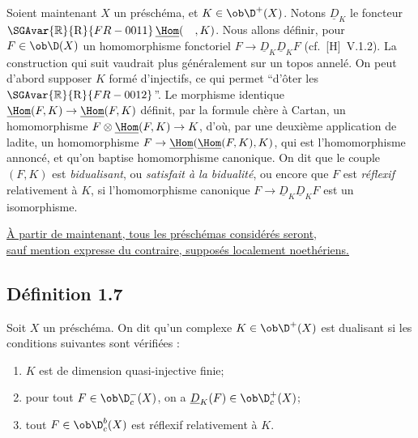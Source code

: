 Soient maintenant $X$ un préschéma, et $K \in \ob \D^{+}(X)$. Notons $\underline{D}_K$ le foncteur $\SGAvar{\mathbb{R}}{\mathrm{R}}{FR-0011}\,\underline{\Hom}(\quad, K)$. Nous allons définir, pour $F \in \ob \D(X)$ un homomorphisme fonctoriel $F \to \underline{D}_K \underline{D}_K F$ (cf.~[H]~V.1.2). La construction qui suit vaudrait plus généralement sur un topos annelé. On peut d'abord supposer $K$
formé d'injectifs, ce qui permet ``d'ôter les $\SGAvar{\mathbb{R}}{\mathrm{R}}{FR-0012}$''. Le morphisme identique $\underline{\Hom}(F,K) \to \underline{\Hom}(F,K)$ définit, par la formule chère à Cartan, un homomorphisme $F \otimes \underline{\Hom}(F,K) \to K$, d'où, par une deuxième application de ladite, un homomorphisme $F \to \underline{\Hom}(\underline{\Hom}(F,K), K)$, qui est l'homomorphisme annoncé, et qu'on baptise homomorphisme canonique. On dit que le couple $(F,K)$ est \emph{bidualisant}, ou \emph{satisfait à la bidualité}, ou encore que $F$ est \emph{réflexif} relativement à $K$, si l'homomorphisme canonique $F \to \underline{D}_K \underline{D}_K F$ est un isomorphisme.

\noindent\underline{À partir de maintenant, tous les préschémas considérés seront,}\\[-0.1em]\underline{sauf mention expresse du contraire, supposés localement noethériens.}

\subsection*{Définition 1.7}
Soit $X$ un préschéma. On dit qu'un complexe $K \in \ob \D^{+}(X)$ est dualisant si les conditions suivantes sont vérifiées :
\begin{enumerate}[label=(\roman*)]
\item $K$ est de dimension quasi-injective finie;
\item pour tout $F \in \ob \D_c^{-}(X)$, on a $\underline{D}_K(F) \in \ob \D_c^{+}(X)$;
\item tout $F \in \ob \D_c^{b}(X)$ est réflexif relativement à $K$.
\end{enumerate}


